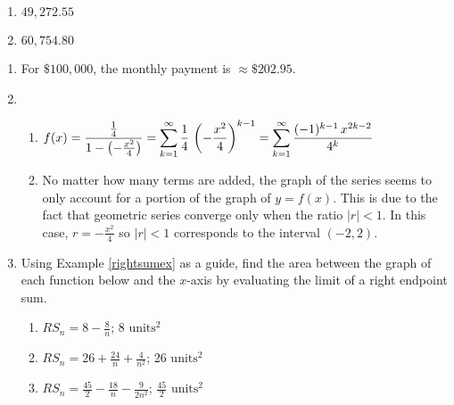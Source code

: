 \begin{multicols}{4}
\begin{enumerate}
\setcounter{enumi}{\value{HW}}


\item $49,\!272.55$

\item  $60,\!754.80$
 
\setcounter{HW}{\value{enumi}}
\end{enumerate}

\end{multicols}

\begin{enumerate}
\setcounter{enumi}{\value{HW}}

\item  For $\$100,\!000$, the monthly payment is $\approx \$202.95$.

\item  \begin{enumerate} \addtocounter{enumii}{1}  \item $f(x) = \dfrac{\frac{1}{4}}{1 - \left( -\frac{x^2}{4} \right)} = \displaystyle{\sum_{k=1}^{\infty} \frac{1}{4} \,\left( -\frac{x^2}{4} \right)^{k-1}} = \displaystyle{\sum_{k=1}^{\infty} \frac{(-1)^{k-1} \, x^{2k-2}}{4^{k}}} $
\item  No matter how many terms are added, the graph of the series seems to only account for a portion of the graph of $y = f(x)$.  This is due to the fact that geometric series converge only when the ratio $|r| < 1$.  In this case, $r =  -\frac{x^2}{4}$ so $|r| < 1$ corresponds to the interval $(-2,2)$.

\end{enumerate}

\item  Using Example \ref{rightsumex} as a guide, find the area between the graph of each function below and the $x$-axis by evaluating the limit of a right endpoint sum.



\begin{enumerate}

\item  $RS_{n} = 8 - \frac{8}{n}$;  8 $\text{units}^2$

\item    $RS_{n} = 26 + \frac{24}{n} + \frac{4}{n^2}$; 26 $\text{units}^2$

\item  $RS_{n} = \frac{45}{2}  - \frac{18}{n} - \frac{9}{2n^2}$;     $\frac{45}{2}$  $\text{units}^2$


\end{enumerate}



\end{enumerate}
